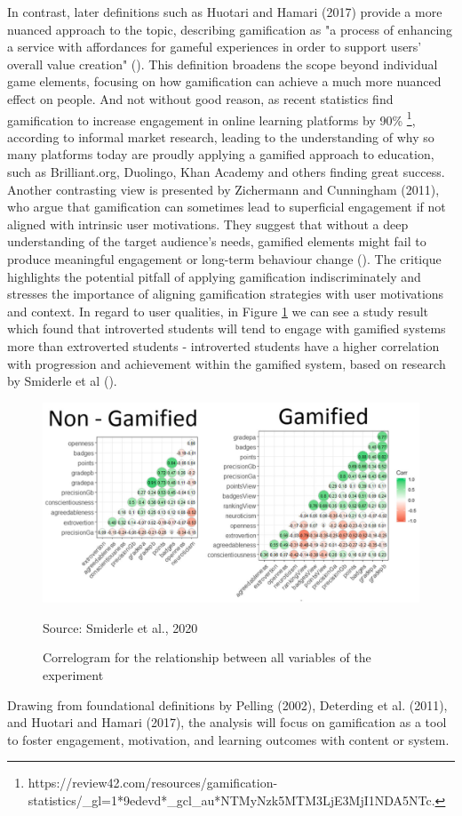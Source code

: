 In contrast, later definitions such as Huotari and Hamari (2017) provide a more nuanced approach to the topic, describing gamification as "a process of enhancing a service with affordances for gameful experiences in order to support users' overall value creation" (\cite{redefinition}).
This definition broadens the scope beyond individual game elements, focusing on how gamification can achieve a much more nuanced effect on people. 
And not without good reason, as recent statistics find gamification to increase engagement in online learning platforms by 90\% \footnote{https://review42.com/resources/gamification-statistics/\_gl=1*9edevd*\_gcl\_au*NTMyNzk5MTM3LjE3MjI1NDA5NTc.}, according to informal market research, leading to the understanding of why so many platforms today are proudly applying a gamified approach to education, such as Brilliant.org, Duolingo, Khan Academy and others finding great success. 
Another contrasting view is presented by Zichermann and Cunningham (2011), who argue that gamification can sometimes lead to superficial engagement if not aligned with intrinsic user motivations. 
They suggest that without a deep understanding of the target audience's needs, gamified elements might fail to produce meaningful engagement or long-term behaviour change (\cite{bookOnEngagement}). 
The critique highlights the potential pitfall of applying gamification indiscriminately and stresses the importance of aligning gamification strategies with user motivations and context. In regard to user qualities, in Figure \ref{fig:gamifiedVSnongamified} we can see a study result which found that introverted students will tend to engage with gamified systems more than extroverted students - introverted students have a higher correlation with progression and achievement within the gamified system, based on research by Smiderle et al (\cite{gamifiedChart}).\\
\begin{figure}[htbp]
 \centering
 \includegraphics[width=\textwidth]{Media/chart.png}
 \caption{Correlogram for the relationship between all variables of the experiment}
 \label{fig:gamifiedVSnongamified}
 {\raggedright \small{Source: Smiderle et al., 2020}\par}
\end{figure}
Drawing from foundational definitions by Pelling (2002), Deterding et al. (2011), and Huotari and Hamari (2017), the analysis will focus on gamification as a tool to foster engagement, motivation, and learning outcomes with content or system.

